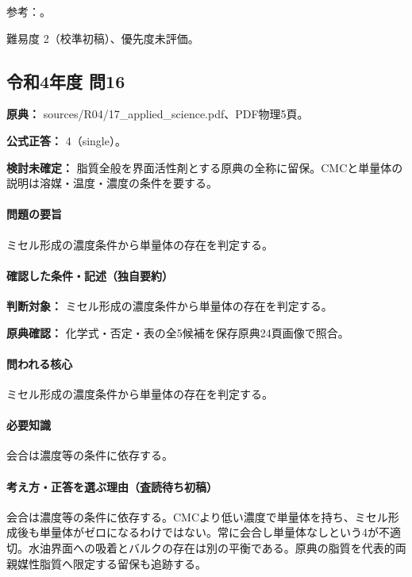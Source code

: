 \par 参考：\cite{organic_cmc}。

\par 難易度 2（校準初稿）、優先度未評価。

\subsection{令和4年度 問16}
\label{q:r04-reg-applied-16}

\noindent\textbf{原典：} sources/R04/17\_applied\_science.pdf、PDF物理5頁。

\textbf{公式正答：} 4（single）。

\par\textbf{検討未確定：} 脂質全般を界面活性剤とする原典の全称に留保。CMCと単量体の説明は溶媒・温度・濃度の条件を要する。

\paragraph{問題の要旨} ミセル形成の濃度条件から単量体の存在を判定する。

\paragraph{確認した条件・記述（独自要約）}\mbox{}\par

\noindent\textbf{判断対象：} ミセル形成の濃度条件から単量体の存在を判定する。\par

\noindent\textbf{原典確認：} 化学式・否定・表の全5候補を保存原典24頁画像で照合。\par

\paragraph{問われる核心} ミセル形成の濃度条件から単量体の存在を判定する。

\paragraph{必要知識} 会合は濃度等の条件に依存する。

\paragraph{考え方・正答を選ぶ理由（査読待ち初稿）} 会合は濃度等の条件に依存する。CMCより低い濃度で単量体を持ち、ミセル形成後も単量体がゼロになるわけではない。常に会合し単量体なしという4が不適切。水油界面への吸着とバルクの存在は別の平衡である。原典の脂質を代表的両親媒性脂質へ限定する留保も追跡する。

